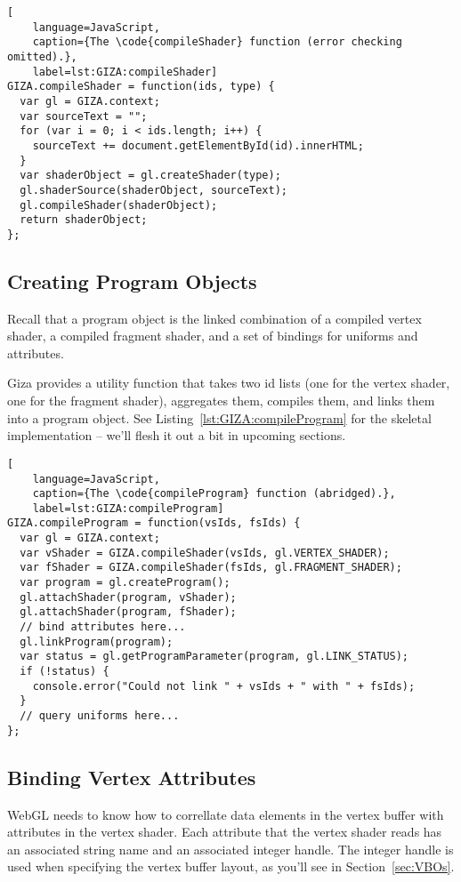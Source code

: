 \begin{lstlisting}[
    language=JavaScript,
    caption={The \code{compileShader} function (error checking omitted).},
    label=lst:GIZA:compileShader]
GIZA.compileShader = function(ids, type) {
  var gl = GIZA.context;
  var sourceText = "";
  for (var i = 0; i < ids.length; i++) {
    sourceText += document.getElementById(id).innerHTML;
  }
  var shaderObject = gl.createShader(type);
  gl.shaderSource(shaderObject, sourceText);
  gl.compileShader(shaderObject);
  return shaderObject;
};
\end{lstlisting}

\subsection{Creating Program Objects}

Recall that a  program object is the linked combination of a compiled vertex shader, a compiled fragment shader, and a set of bindings for uniforms and attributes.

Giza provides a utility function that takes two id lists (one for the vertex shader, one for the fragment shader), aggregates them, compiles them, and links them into a program object.  See Listing~\ref{lst:GIZA:compileProgram} for the skeletal implementation -- we'll flesh it out a bit in upcoming sections.

\begin{lstlisting}[
    language=JavaScript,
    caption={The \code{compileProgram} function (abridged).},
    label=lst:GIZA:compileProgram]
GIZA.compileProgram = function(vsIds, fsIds) {
  var gl = GIZA.context;
  var vShader = GIZA.compileShader(vsIds, gl.VERTEX_SHADER);
  var fShader = GIZA.compileShader(fsIds, gl.FRAGMENT_SHADER);
  var program = gl.createProgram();
  gl.attachShader(program, vShader);
  gl.attachShader(program, fShader);
  // bind attributes here...
  gl.linkProgram(program);
  var status = gl.getProgramParameter(program, gl.LINK_STATUS);
  if (!status) {
    console.error("Could not link " + vsIds + " with " + fsIds);
  }
  // query uniforms here...
};
\end{lstlisting}

\subsection{Binding Vertex Attributes}

WebGL needs to know how to correllate data elements in the vertex buffer with attributes in the vertex shader.  Each attribute that the vertex shader reads has an associated string name and an associated integer handle.  The integer handle is used when specifying the vertex buffer layout, as you'll see in Section~\ref{sec:VBOs}.

